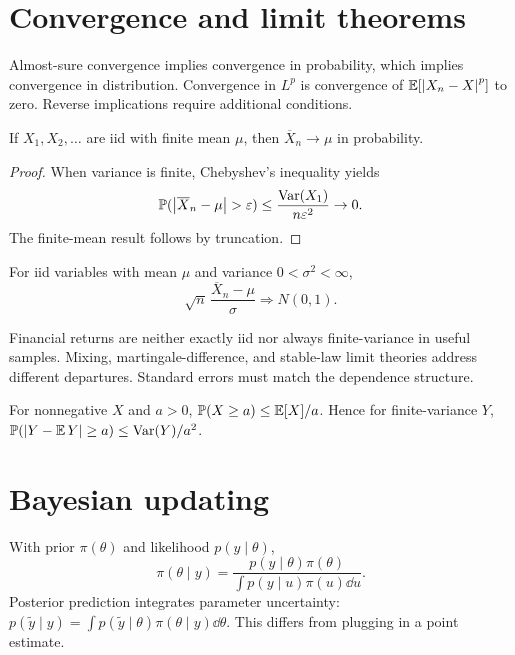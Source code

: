 \section{Convergence and limit theorems}

Almost-sure convergence implies convergence in probability, which implies
convergence in distribution. Convergence in $L^p$ is convergence of
$\operatorname{\mathbb E}[\left|X_n-X\right|^p]$ to zero. Reverse implications require additional conditions.

\begin{theorem}
If $X_1,X_2,\ldots$ are iid with finite mean $\mu$, then
$\overline X_n\to\mu$ in probability.
\end{theorem}
\begin{proof}
When variance is finite, Chebyshev's inequality yields
\[
\Prob(\abs{\overline X_n-\mu}>\varepsilon)
\leq\frac{\Var(X_1)}{n\varepsilon^2}\to0.
\]
The finite-mean result follows by truncation.
\end{proof}

\begin{theorem}
For iid variables with mean $\mu$ and variance $0<\sigma^2<\infty$,
\[
\sqrt n\,\frac{\overline X_n-\mu}{\sigma}\Rightarrow N(0,1).
\]
\end{theorem}

Financial returns are neither exactly iid nor always finite-variance in useful
samples. Mixing, martingale-difference, and stable-law limit theories address
different departures. Standard errors must match the dependence structure.

\begin{proposition}
For nonnegative $X$ and $a>0$, $\mathbb P(X\geq a)\leq\operatorname{\mathbb E}[X]/a$. Hence for finite-variance
$Y$, $\mathbb P(\left|Y-\operatorname{\mathbb E} Y\right|\geq a)\leq\operatorname{Var}(Y)/a^2$.
\end{proposition}

\section{Bayesian updating}

With prior $\pi(\theta)$ and likelihood $p(y\mid\theta)$,
\[
\pi(\theta\mid y)
=\frac{p(y\mid\theta)\pi(\theta)}
{\int p(y\mid u)\pi(u)\dd u}.
\]
Posterior prediction integrates parameter uncertainty:
$p(\widetilde y\mid y)=\int p(\widetilde y\mid\theta)\pi(\theta\mid y)\dd\theta$.
This differs from plugging in a point estimate.


